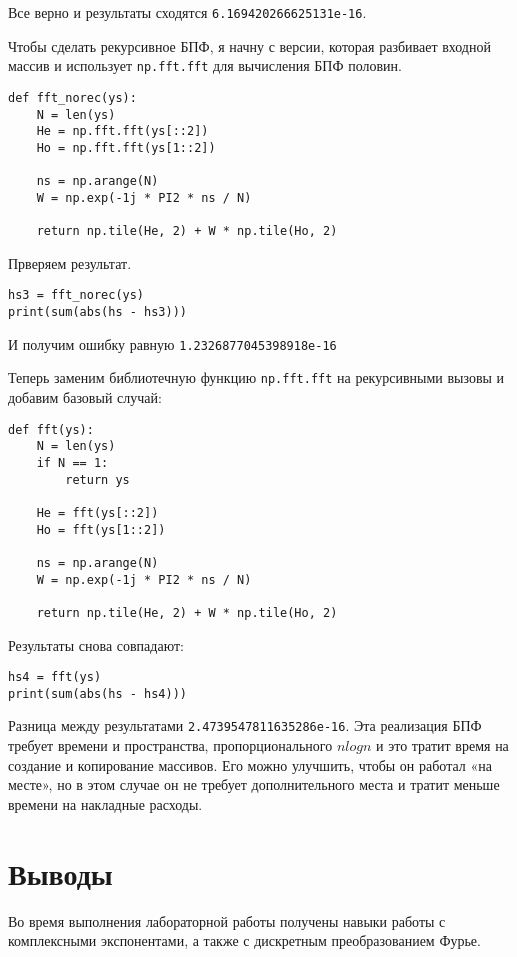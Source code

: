 \documentclass[a4paper,12pt]{report}
\begin{document}
Все верно и результаты сходятся \texttt{6.169420266625131e-16}.  

Чтобы сделать рекурсивное БПФ, я начну с версии, которая разбивает входной массив и использует \texttt{np.fft.fft} для вычисления БПФ половин.

\begin{lstlisting}[caption=Функция \texttt{fft\_norec}]
def fft_norec(ys):
    N = len(ys)
    He = np.fft.fft(ys[::2])
    Ho = np.fft.fft(ys[1::2])
    
    ns = np.arange(N)
    W = np.exp(-1j * PI2 * ns / N)
    
    return np.tile(He, 2) + W * np.tile(Ho, 2)
\end{lstlisting}

Прверяем результат.

\begin{lstlisting}[caption=Сравнение реализаций]
hs3 = fft_norec(ys)
print(sum(abs(hs - hs3)))
\end{lstlisting}

И получим ошибку равную \texttt{1.2326877045398918e-16}

Теперь заменим библиотечную функцию \texttt{np.fft.fft} на рекурсивными вызовы и добавим базовый случай:

\begin{lstlisting}[caption=Функция \texttt{fft}]
def fft(ys):
    N = len(ys)
    if N == 1:
        return ys
    
    He = fft(ys[::2])
    Ho = fft(ys[1::2])
    
    ns = np.arange(N)
    W = np.exp(-1j * PI2 * ns / N)
    
    return np.tile(He, 2) + W * np.tile(Ho, 2)
\end{lstlisting}

Результаты снова совпадают:

\begin{lstlisting}[caption=Сравнение реализаций]
hs4 = fft(ys)
print(sum(abs(hs - hs4)))
\end{lstlisting}

Разница между результатами \texttt{2.4739547811635286e-16}.
Эта реализация БПФ требует времени и пространства, пропорционального $nlogn$ и это тратит время на создание и копирование массивов. Его можно улучшить, чтобы он работал «на месте», но в этом случае он не требует дополнительного места и тратит меньше времени на накладные расходы.

\chapter{Выводы}

Во время выполнения лабораторной работы получены навыки работы с комплексными экспонентами, а также с дискретным преобразованием Фурье.
\end{document}
